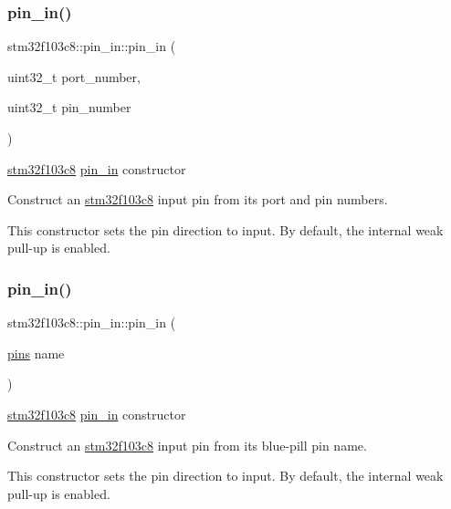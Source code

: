 \subsubsection{\texorpdfstring{pin\+\_\+in()}{pin\_in()}\hspace{0.1cm}{\footnotesize\ttfamily [1/2]}}
{\footnotesize\ttfamily stm32f103c8\+::pin\+\_\+in\+::pin\+\_\+in (\begin{DoxyParamCaption}\item[{uint32\+\_\+t}]{port\+\_\+number,  }\item[{uint32\+\_\+t}]{pin\+\_\+number }\end{DoxyParamCaption})\hspace{0.3cm}{\ttfamily [inline]}}

\hyperlink{namespacestm32f103c8}{stm32f103c8} \hyperlink{classstm32f103c8_1_1pin__in}{pin\+\_\+in} constructor

Construct an \hyperlink{namespacestm32f103c8}{stm32f103c8} input pin from its port and pin numbers.

This constructor sets the pin direction to input. By default, the internal weak pull-\/up is enabled. \mbox{\label{classstm32f103c8_1_1pin__in_ac6e4218a9392cd25a72dc363bbbb2a00}} 
\subsubsection{\texorpdfstring{pin\+\_\+in()}{pin\_in()}\hspace{0.1cm}{\footnotesize\ttfamily [2/2]}}
{\footnotesize\ttfamily stm32f103c8\+::pin\+\_\+in\+::pin\+\_\+in (\begin{DoxyParamCaption}\item[{\hyperlink{namespacestm32f103c8_a69d642506db309a7e64295d35ec21ff6}{pins}}]{name }\end{DoxyParamCaption})\hspace{0.3cm}{\ttfamily [inline]}}

\hyperlink{namespacestm32f103c8}{stm32f103c8} \hyperlink{classstm32f103c8_1_1pin__in}{pin\+\_\+in} constructor

Construct an \hyperlink{namespacestm32f103c8}{stm32f103c8} input pin from its blue-\/pill pin name.

This constructor sets the pin direction to input. By default, the internal weak pull-\/up is enabled. 

